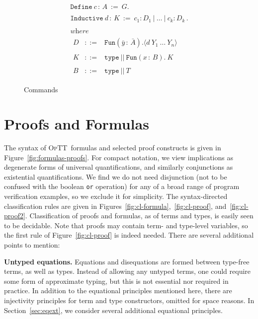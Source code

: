 \documentclass[preprint,natbib]{sigplanconf}
\newcommand{\optt}{\textsc{OpTT}}
\begin{document}
\begin{figure}
\[
\begin{array}{l} 
\texttt{Define}\ c\, :\, A\ :=\ G. \\ \\
\texttt{Inductive}\ d\, :\, K \ := \ c_1 : D_1\ |\ \ldots\ |\ c_k : D_k\, .
\\ \\ 
\textit{where}\\
\begin{array}{lll}
D & ::= & \texttt{Fun}(\bar{y}\,:\,\bar{A}) . \langle  d\ Y_1\ \ldots\ Y_n\rangle
\\
\\
K & ::= & \texttt{type}\ ||\ \texttt{Fun}(x\,:\,B).\ K
\\
\\ 
B & ::= & \texttt{type}\ ||\ T
\end{array}
\end{array}
\]
\caption{\label{fig:command}Commands}
\end{figure}

\section{Proofs and Formulas}
\label{sec:pfs}

The syntax of \optt\ formulas and selected proof constructs is given
in Figure~\ref{fig:formulas-proofs}.  For compact notation, we view
implications as degenerate forms of universal quantifications, and
similarly conjunctions as existential quantifications.  We find we do
not need disjunction (not to be confused with the boolean \texttt{or}
operation) for any of a broad range of program verification examples,
so we exclude it for simplicity.  The syntax-directed classification
rules are given in Figures~\ref{fig:cl-formula},~\ref{fig:cl-proof},
and~\ref{fig:cl-proof2}.  Classification of proofs and formulas, as of
terms and types, is easily seen to be decidable.  Note that proofs may
contain term- and type-level variables, so the first rule of
Figure~\ref{fig:cl-proof} is indeed needed.  There are several
additional points to mention:

\textbf{Untyped equations.} Equations and disequations are formed
between type-free terms, as well as types.  Instead of allowing any
untyped terms, one could require some form of approximate typing, but
this is not essential nor required in practice.  In addition to the
equational principles mentioned here, there are injectivity principles
for term and type constructors, omitted for space reasons.  In
Section~\ref{sec:eqext}, we consider several additional equational
principles.
\end{document}
